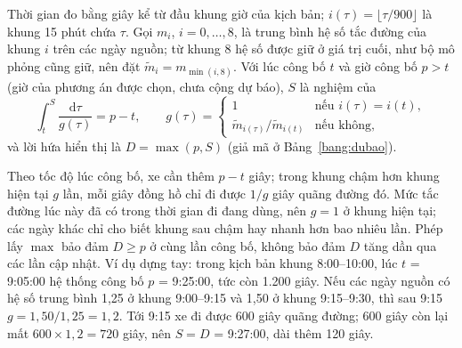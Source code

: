 Thời gian đo bằng giây kể từ đầu khung giờ của kịch bản; $i(\tau) = \lfloor \tau / 900 \rfloor$ là khung 15 phút
chứa $\tau$. Gọi $m_i$, $i = 0, \ldots, 8$, là trung bình hệ số tắc đường của khung $i$ trên các ngày nguồn; từ
khung 8 hệ số được giữ ở giá trị cuối, như bộ mô phỏng cũng giữ, nên đặt $\tilde m_i = m_{\min(i, 8)}$. Với lúc
công bố $t$ và giờ công bố $p > t$ (giờ của phương án được chọn, chưa cộng dự báo), $S$ là nghiệm của
\begin{equation}
\int_{t}^{S} \frac{\mathrm{d}\tau}{g(\tau)} = p - t, \qquad
g(\tau) =
\begin{cases}
1 & \text{nếu } i(\tau) = i(t),\\
\tilde m_{i(\tau)} / \tilde m_{i(t)} & \text{nếu không,}
\end{cases}
\label{eq:keodan}
\end{equation}
và lời hứa hiển thị là $D = \max(p, S)$ (giả mã ở Bảng~\ref{bang:dubao}).

Theo tốc độ lúc công bố, xe cần thêm $p - t$ giây; trong khung chậm hơn khung hiện tại $g$ lần, mỗi giây đồng hồ
chỉ đi được $1/g$ giây quãng đường đó. Mức tắc đường lúc này đã có trong thời gian đi đang dùng, nên $g = 1$ ở khung
hiện tại; các ngày khác chỉ cho biết khung sau chậm hay nhanh hơn bao nhiêu lần. Phép lấy $\max$ bảo đảm $D \ge p$ ở
cùng lần công bố, không bảo đảm $D$ tăng dần qua các lần cập nhật. Ví dụ dựng tay: trong kịch bản khung
8:00--10:00, lúc $t$ = 9:05:00 hệ thống công bố $p$ = 9:25:00, tức còn 1.200 giây. Nếu các ngày nguồn có hệ số trung
bình 1,25 ở khung 9:00--9:15 và 1,50 ở khung 9:15--9:30, thì sau 9:15 $g = 1{,}50/1{,}25 = 1{,}2$. Tới 9:15 xe đi
được 600 giây quãng đường; 600 giây còn lại mất $600 \times 1{,}2 = 720$ giây, nên $S = D$ = 9:27:00, dài thêm 120
giây.

